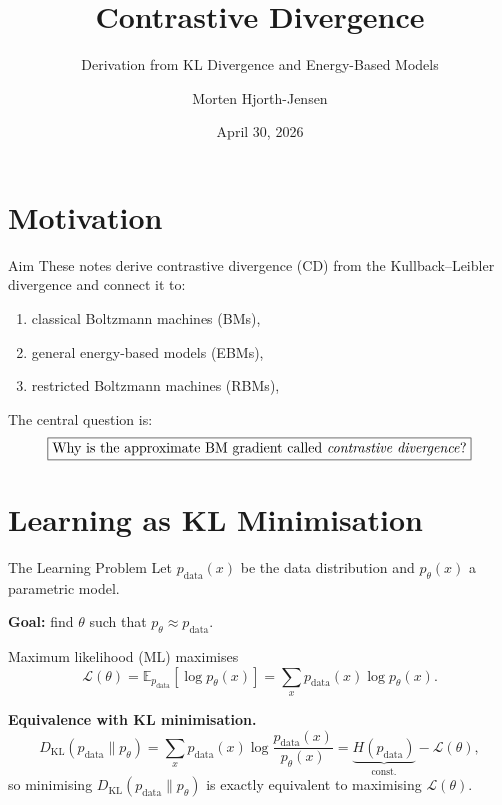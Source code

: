 \documentclass[aspectratio=169]{beamer}
\title{Contrastive Divergence}
\subtitle{Derivation from KL Divergence and Energy-Based Models}
\author{Morten Hjorth-Jensen}
\date{April 30, 2026}
\newcommand{\E}{\mathbb{E}}
\newcommand{\pdata}{p_{\mathrm{data}}}
\newcommand{\pmodel}{p_{\theta}}
\newcommand{\DKL}{D_{\mathrm{KL}}}
\begin{document}
\frame{\titlepage}

\section{Motivation}

\begin{frame}{Aim}
These notes derive contrastive divergence (CD) from the Kullback--Leibler
divergence and connect it to:
\begin{enumerate}
  \item classical Boltzmann machines (BMs),
  \item general energy-based models (EBMs),
  \item restricted Boltzmann machines (RBMs),
\end{enumerate}

The central question is:
\[
  \boxed{\text{Why is the approximate BM gradient called
  \emph{contrastive divergence}?}}
\]
\end{frame}

\section{Learning as KL Minimisation}

\begin{frame}{The Learning Problem}
Let $\pdata(x)$ be the data distribution and $\pmodel(x)$ a parametric model.

\textbf{Goal:} find $\theta$ such that $\pmodel \approx \pdata$.

\medskip
Maximum likelihood (ML) maximises
\[
  \mathcal{L}(\theta)
  = \E_{\pdata}[\log \pmodel(x)]
  = \sum_x \pdata(x)\log\pmodel(x).
\]

\medskip
\textbf{Equivalence with KL minimisation.}
\[
  \DKL(\pdata\|\pmodel)
  = \sum_x \pdata(x)\log\frac{\pdata(x)}{\pmodel(x)}
  = \underbrace{H(\pdata)}_{\text{const.}} - \mathcal{L}(\theta),
\]
so minimising $\DKL(\pdata\|\pmodel)$ is exactly equivalent to maximising $\mathcal{L}(\theta)$.
\end{frame}
\end{document}
